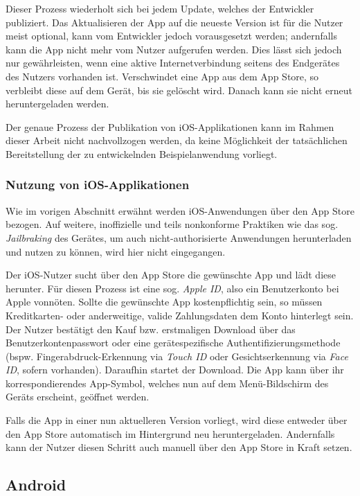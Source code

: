 Dieser Prozess wiederholt sich bei jedem Update, welches der Entwickler publiziert. Das Aktualisieren der App auf die neueste Version ist für die Nutzer meist optional, kann vom Entwickler jedoch vorausgesetzt werden; andernfalls kann die App nicht mehr vom Nutzer aufgerufen werden. Dies lässt sich jedoch nur gewährleisten, wenn eine aktive Internetverbindung seitens des Endgerätes des Nutzers vorhanden ist. Verschwindet eine App aus dem App Store, so verbleibt diese auf dem Gerät, bis sie gelöscht wird. Danach kann sie nicht erneut heruntergeladen werden.

Der genaue Prozess der Publikation von iOS-Applikationen kann im Rahmen dieser Arbeit nicht nachvollzogen werden, da keine Möglichkeit der tatsächlichen Bereitstellung der zu entwickelnden Beispielanwendung vorliegt.

\subsubsection{Nutzung von iOS-Applikationen} \label{subsubsec:use-ios}
Wie im vorigen Abschnitt erwähnt werden iOS-Anwendungen über den App Store bezogen. Auf weitere, inoffizielle und teils nonkonforme Praktiken wie das sog. \textit{Jailbraking} des Gerätes, um auch nicht-authorisierte Anwendungen herunterladen und nutzen zu können, wird hier nicht eingegangen.

Der iOS-Nutzer sucht über den App Store die gewünschte App und lädt diese herunter. Für diesen Prozess ist eine sog. \textit{Apple ID}, also ein Benutzerkonto bei Apple vonnöten. Sollte die gewünschte App kostenpflichtig sein, so müssen Kreditkarten- oder anderweitige, valide Zahlungsdaten dem Konto hinterlegt sein. Der Nutzer bestätigt den Kauf bzw. erstmaligen Download über das Benutzerkontenpasswort oder eine gerätespezifische Authentifizierungsmethode (bspw. Fingerabdruck-Erkennung via \textit{Touch ID} oder Gesichtserkennung via \textit{Face ID}, sofern vorhanden). Daraufhin startet der Download. Die App kann über ihr korrespondierendes App-Symbol, welches nun auf dem Menü-Bildschirm des Geräts erscheint, geöffnet werden.

Falls die App in einer nun aktuelleren Version vorliegt, wird diese entweder über den App Store automatisch im Hintergrund neu heruntergeladen. Andernfalls kann der Nutzer diesen Schritt auch manuell über den App Store in Kraft setzen.

\subsection{Android}

